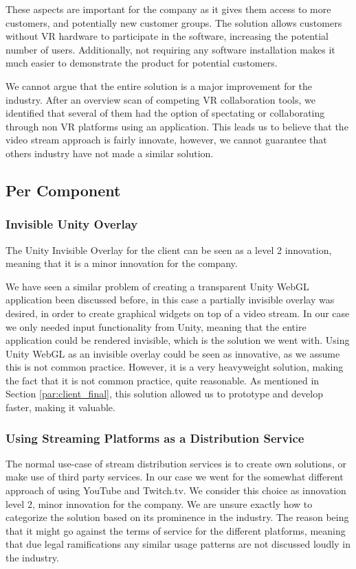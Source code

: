 These aspects are important for the company as it gives them access to more customers, and potentially new customer groups. The solution allows customers without VR hardware to participate in the software, increasing the potential number of users. Additionally, not requiring any software installation makes it much easier to demonstrate the product for potential customers.

We cannot argue that the entire solution is a major improvement for the industry. After an overview scan of competing VR collaboration tools, we identified that several of them had the option of spectating or collaborating through non VR platforms using an application. This leads us to believe that the video stream approach is fairly innovate, however, we cannot guarantee that others industry have not made a similar solution.

\subsection{Per Component}
\subsubsection{Invisible Unity Overlay}
The Unity Invisible Overlay for the client can be seen as a level 2 innovation, meaning that it is a minor innovation for the company\cite{nrcs}. 

We have seen a similar problem of creating a transparent Unity WebGL application been discussed before\cite{unity_transparent_webgl}, in this case a partially invisible overlay was desired, in order to create graphical widgets on top of a video stream\cite{unity_forum_partially_invisible}. In our case we only needed input functionality from Unity, meaning that the entire application could be rendered invisible, which is the solution we went with. Using Unity WebGL as an invisible overlay could be seen as innovative, as we assume this is not common practice. However, it is a very heavyweight solution, making the fact that it is not common practice, quite reasonable. As mentioned in Section \ref{par:client_final}, this solution allowed us to prototype and develop faster, making it valuable.

\subsubsection{Using Streaming Platforms as a Distribution Service}
The normal use-case of stream distribution services is to create own solutions, or make use of third party services. In our case we went for the somewhat different approach of using YouTube and Twitch.tv. We consider this choice as innovation level 2, minor innovation for the company\cite{nrcs}. We are unsure exactly how to categorize the solution based on its prominence in the industry. The reason being that it might go against the terms of service for the different platforms, meaning that due legal ramifications any similar usage patterns are not discussed loudly in the industry. 



